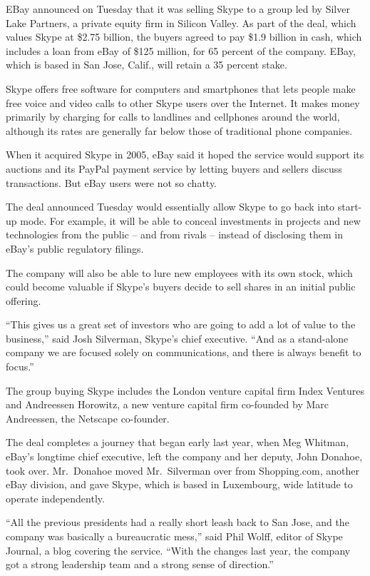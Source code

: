 ﻿\documentclass[12pt]{article}
\begin{document}
EBay announced on Tuesday that it was selling Skype to a group led by Silver Lake Partners, a
private equity firm in Silicon Valley. As part of the deal, which values Skype at \$2.75 billion,
the buyers agreed to pay \$1.9 billion in cash, which includes a loan from eBay of \$125 million,
for 65 percent of the company. EBay, which is based in San Jose, Calif., will retain a 35 percent
stake.

Skype offers free software for computers and smartphones that lets people make free voice and video
calls to other Skype users over the Internet. It makes money primarily by charging for calls to
landlines and cellphones around the world, although its rates are generally far below those of
traditional phone companies.

When it acquired Skype in 2005, eBay said it hoped the service would support its auctions and its
PayPal payment service by letting buyers and sellers discuss transactions. But eBay users were not
so chatty.

The deal announced Tuesday would essentially allow Skype to go back into start-up mode. For example,
it will be able to conceal investments in projects and new technologies from the public -- and from
rivals -- instead of disclosing them in eBay's public regulatory filings.

The company will also be able to lure new employees with its own stock, which could become valuable
if Skype's buyers decide to sell shares in an initial public offering.

``This gives us a great set of investors who are going to add a lot of value to the business,'' said
Josh Silverman, Skype's chief executive. ``And as a stand-alone company we are focused solely on
communications, and there is always benefit to focus.''

The group buying Skype includes the London venture capital firm Index Ventures and Andreessen
Horowitz, a new venture capital firm co-founded by Marc Andreessen, the Netscape co-founder.

The deal completes a journey that began early last year, when Meg Whitman, eBay's longtime chief
executive, left the company and her deputy, John Donahoe, took over. Mr.~Donahoe moved Mr.~Silverman
over from Shopping.com, another eBay division, and gave Skype, which is based in Luxembourg, wide
latitude to operate independently.

``All the previous presidents had a really short leash back to San Jose, and the company was
basically a bureaucratic mess,'' said Phil Wolff, editor of Skype Journal, a blog covering the
service. ``With the changes last year, the company got a strong leadership team and a strong sense
of direction.''
\end{document}
